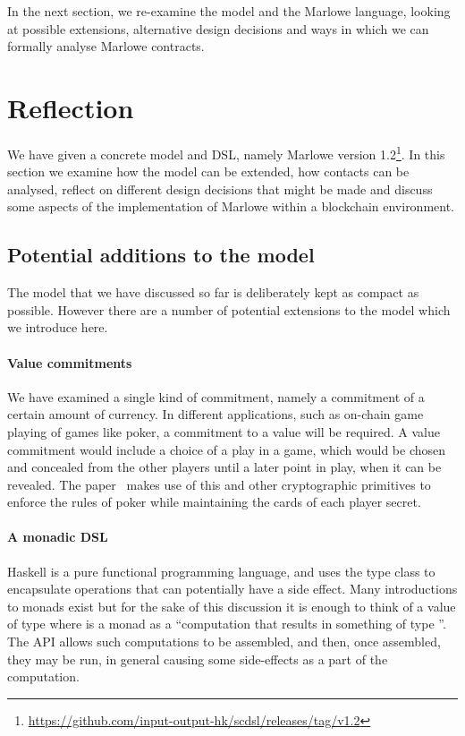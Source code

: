 \documentclass[runningheads]{llncs}
\begin{document}
In the next section, we re-examine the model and the Marlowe language, looking at possible extensions, alternative 
design decisions and ways in which we can formally analyse Marlowe contracts.

\section{Reflection}
\label{section:reflection}

We have given a concrete model and DSL, namely Marlowe version 
1.2\footnote{\url{https://github.com/input-output-hk/scdsl/releases/tag/v1.2}}.
In this section we examine how the model can be extended, how contacts can be analysed, reflect on different design 
decisions that might be made and discuss some aspects of the implementation of Marlowe within a blockchain environment.

\subsection{Potential additions to the model}

The model that we have discussed so far is deliberately kept as compact as possible. However there are a number of 
potential extensions to the model which we introduce here. 

\paragraph{Value commitments}

We have examined a single kind of commitment, namely a commitment of a certain amount of currency. In different 
applications, such as on-chain game playing of games like poker, a commitment to a value will be required. A value 
commitment would include a choice of a play in a game, which would be chosen and concealed from the other players until 
a later point in play, when it can be revealed. The paper~\cite{kumaresan2015use} makes use of this and other 
cryptographic primitives to enforce the rules of poker while maintaining the cards of each player secret.

\paragraph{A monadic DSL}

Haskell is a pure functional programming language, and uses the  type class to encapsulate
operations that can potentially have a side effect. Many introductions to monads exist \cite{wadler1990comprehending} 
but for the sake of this discussion it is enough to think of a value of type  where  
is a monad as a ``computation that results in something of type ''. The  API 
allows such computations to be assembled, and then, once assembled, they may be run, in general causing some 
side-effects as a part of the computation.
\end{document}
